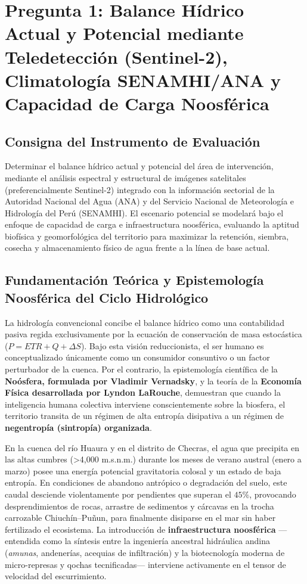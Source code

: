 \documentclass[11pt,a4paper]{article}
\begin{document}
\newpage

\section{Pregunta 1: Balance Hídrico Actual y Potencial mediante Teledetección (Sentinel-2), Climatología SENAMHI/ANA y Capacidad de Carga Noosférica}

\subsection{Consigna del Instrumento de Evaluación}
Determinar el balance hídrico actual y potencial del área de intervención, mediante el análisis espectral y estructural de imágenes satelitales (preferencialmente Sentinel-2) integrado con la información sectorial de la Autoridad Nacional del Agua (ANA) y del Servicio Nacional de Meteorología e Hidrología del Perú (SENAMHI). El escenario potencial se modelará bajo el enfoque de capacidad de carga e infraestructura noosférica, evaluando la aptitud biofísica y geomorfológica del territorio para maximizar la retención, siembra, cosecha y almacenamiento físico de agua frente a la línea de base actual.

\subsection{Fundamentación Teórica y Epistemología Noosférica del Ciclo Hidrológico}
La hidrología convencional concibe el balance hídrico como una contabilidad pasiva regida exclusivamente por la ecuación de conservación de masa estocástica ($P = ETR + Q + \Delta S$). Bajo esta visión reduccionista, el ser humano es conceptualizado únicamente como un consumidor consuntivo o un factor perturbador de la cuenca. Por el contrario, la epistemología científica de la \textbf{Noósfera, formulada por Vladimir Vernadsky}, y la teoría de la \textbf{Economía Física desarrollada por Lyndon LaRouche}, demuestran que cuando la inteligencia humana colectiva interviene conscientemente sobre la biosfera, el territorio transita de un régimen de alta entropía disipativa a un régimen de \textbf{negentropía (sintropía) organizada}.

En la cuenca del río Huaura y en el distrito de Checras, el agua que precipita en las altas cumbres (>4,000 m.s.n.m.) durante los meses de verano austral (enero a marzo) posee una energía potencial gravitatoria colosal y un estado de baja entropía. En condiciones de abandono antrópico o degradación del suelo, este caudal desciende violentamente por pendientes que superan el $45\%$, provocando desprendimientos de rocas, arrastre de sedimentos y cárcavas en la trocha carrozable Chiuchín--Puñun, para finalmente disiparse en el mar sin haber fertilizado el ecosistema. La introducción de \textbf{infraestructura noosférica} —entendida como la síntesis entre la ingeniería ancestral hidráulica andina (\textit{amunas}, andenerías, acequias de infiltración) y la biotecnología moderna de micro-represas y qochas tecnificadas— interviene activamente en el tensor de velocidad del escurrimiento.
\end{document}
